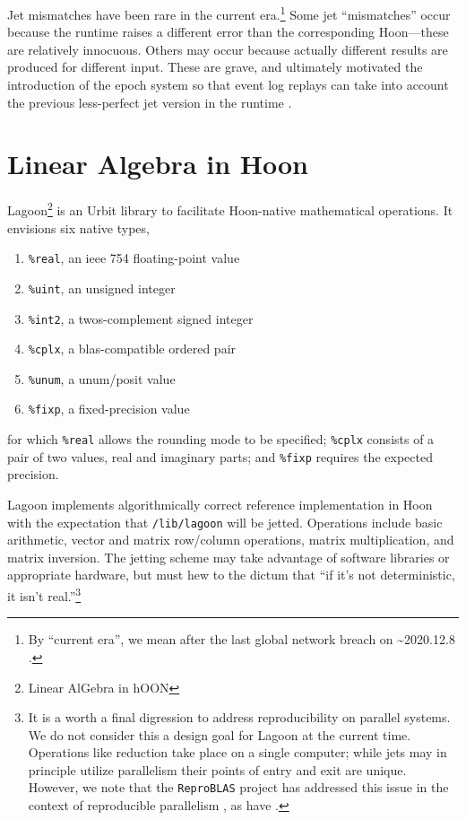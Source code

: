 \documentclass[twoside]{article}
\begin{document}
Jet mismatches have been rare in the current era.\footnote{By “current era”, we mean after the last global network breach on \textasciitilde 2020.12.8 \citep{UrbitBreach}.}  Some jet “mismatches” occur because the runtime raises a different error than the corresponding Hoon—these are relatively innocuous.  Others may occur because actually different results are produced for different input.  These are grave, and ultimately motivated the introduction of the epoch system so that event log replays can take into account the previous less-perfect jet version in the runtime \citep{UrbitEpoch}.

\section{Linear Algebra in Hoon}

Lagoon\footnote{Linear AlGebra in hOON} is an Urbit library to facilitate Hoon-native mathematical operations.  It envisions six native types,

\begin{enumerate}
  \item  \lstinline[style=inlinecode]{%real}, an {\sc ieee} 754 floating-point value
  \item  \lstinline[style=inlinecode]{%uint}, an unsigned integer
  \item  \lstinline[style=inlinecode]{%int2}, a twos-complement signed integer
  \item  \lstinline[style=inlinecode]{%cplx}, a {\sc blas}-compatible ordered pair
  \item  \lstinline[style=inlinecode]{%unum}, a unum/posit value
  \item  \lstinline[style=inlinecode]{%fixp}, a fixed-precision value
\end{enumerate}

\noindent
for which \lstinline[style=inlinecode]{%real} allows the rounding mode to be specified; \lstinline[style=inlinecode]{%cplx} consists of a pair of two values, real and imaginary parts; and \lstinline[style=inlinecode]{%fixp} requires the expected precision.

Lagoon implements algorithmically correct reference implementation in Hoon with the expectation that \lstinline[style=inlinecode]{/lib/lagoon} will be jetted.  Operations include basic arithmetic, vector and matrix row/column operations, matrix multiplication, and matrix inversion.  The jetting scheme may take advantage of software libraries or appropriate hardware, but must hew to the dictum that “if it's not deterministic, it isn't real.”\footnote{It is a worth a final digression to address reproducibility on parallel systems.  We do not consider this a design goal for Lagoon at the current time.  Operations like reduction take place on a single computer; while jets may in principle utilize parallelism their points of entry and exit are unique.  However, we note that the \texttt{ReproBLAS} project has addressed this issue in the context of reproducible parallelism \citep{ReproBLAS}, as have \citet{Chohra2016}.}
\end{document}
